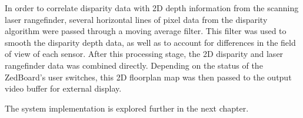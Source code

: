 \par
In order to correlate disparity data with 2D depth information from the scanning laser rangefinder, several horizontal lines of pixel data from the disparity algorithm were passed through a moving average filter. This filter was used to smooth the disparity depth data, as well as to account for differences in the field of view of each sensor. After this processing stage, the 2D disparity and laser rangefinder data was combined directly. Depending on the status of the ZedBoard's user switches, this 2D floorplan map was then passed to the output video buffer for external display.
\par
The system implementation is explored further in the next chapter.